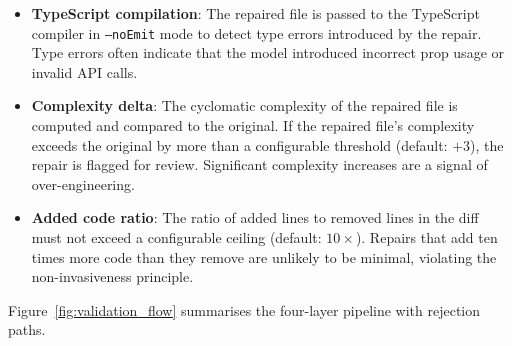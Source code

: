 \begin{itemize}
  \item \textbf{TypeScript compilation}: The repaired file is passed to the
    TypeScript compiler in \texttt{--noEmit} mode to detect type errors
    introduced by the repair.  Type errors often indicate that the model
    introduced incorrect prop usage or invalid API calls.
  \item \textbf{Complexity delta}: The cyclomatic complexity of the repaired
    file is computed and compared to the original.  If the repaired file's
    complexity exceeds the original by more than a configurable threshold
    (default: $+3$), the repair is flagged for review.  Significant complexity
    increases are a signal of over-engineering.
  \item \textbf{Added code ratio}: The ratio of added lines to removed lines
    in the diff must not exceed a configurable ceiling (default: $10\times$).
    Repairs that add ten times more code than they remove are unlikely to
    be minimal, violating the non-invasiveness principle.
\end{itemize}

Figure~\ref{fig:validation_flow} summarises the four-layer pipeline with
rejection paths.

